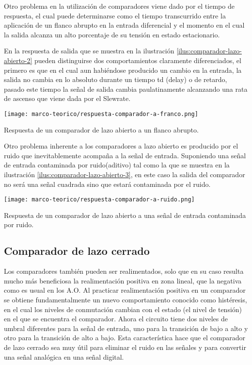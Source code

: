 Otro problema en la utilización de comparadores viene dado por el tiempo de respuesta, el cual puede determinarse como el tiempo transcurrido entre la aplicación de un flanco abrupto en la entrada diferencial y el momento en el cual la salida alcanza un alto porcentaje de su tensión en estado estacionario.

En la respuesta de salida que se muestra en la ilustración \ref{ilus:comparador-lazo-abierto-2} pueden distinguirse dos comportamientos claramente diferenciados, el primero es que en el cual aun habiéndose producido un cambio en la entrada, la salida no cambia en lo absoluto durante un tiempo td (delay) o de retardo, pasado este tiempo la señal de salida cambia paulatinamente alcanzando una rata de ascenso que viene dada por el Slewrate.

\begin{ilustracion}[ht]
  \centering
  \texttt{[image: marco-teorico/respuesta-comparador-a-franco.png]}
  \caption{Respuesta de un comparador de lazo abierto a un flanco abrupto.}
  \label{ilus:comparador-lazo-abierto-2}
\end{ilustracion}

Otro problema inherente a los comparadores a lazo abierto es producido por el ruido que inevitablemente acompaña a la señal de entrada. Suponiendo una señal de entrada contaminada por ruido(aditivo) tal como la que se muestra en la ilustración \ref{ilus:comparador-lazo-abierto-3}, en este caso la salida del comparador no será una señal cuadrada sino que estará contaminada por el ruido.

\begin{ilustracion}[ht]
  \centering
  \texttt{[image: marco-teorico/respuesta-comparador-a-ruido.png]}
  \caption{Respuesta de un comparador de lazo abierto a una señal de entrada contaminada por ruido.}
  \label{ilus:comparador-lazo-abierto-3}
\end{ilustracion}

\subsection{Comparador de lazo cerrado}

Los comparadores también pueden ser realimentados, solo que en su caso resulta mucho más beneficiosa la realimentación positiva en zona lineal, que la negativa como es usual en los A.O. Al practicar realimentación positiva en un comparador se obtiene fundamentalmente un nuevo comportamiento conocido como histéresis, en el cual los niveles de conmutación cambian con el estado (el nivel de tensión) en el que se encuentra el comparador. Ahora el circuito tiene dos niveles de umbral diferentes para la señal de entrada, uno para la transición de bajo a alto y otro para la transición de alto a bajo. Esta característica hace que el comparador de lazo cerrado sea muy útil para eliminar el ruido en las señales y para convertir una señal analógica en una señal digital. \cite[pag. ]{rivero-ao}

